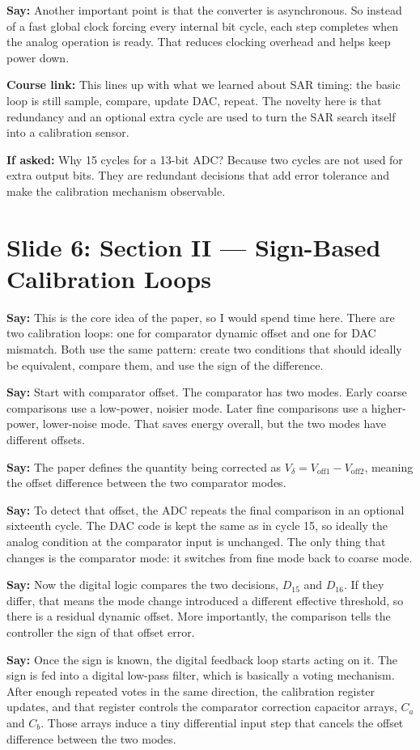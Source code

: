 \documentclass[11pt]{article}
\newcommand{\speak}[1]{\textbf{Say:} #1}
\newcommand{\ifasked}[1]{\textbf{If asked:} #1}
\newcommand{\course}[1]{\textbf{Course link:} #1}
\begin{document}
\speak{Another important point is that the converter is asynchronous. So instead of a fast global clock forcing every internal bit cycle, each step completes when the analog operation is ready. That reduces clocking overhead and helps keep power down.}

\course{This lines up with what we learned about SAR timing: the basic loop is still sample, compare, update DAC, repeat. The novelty here is that redundancy and an optional extra cycle are used to turn the SAR search itself into a calibration sensor.}

\ifasked{Why 15 cycles for a 13-bit ADC? Because two cycles are not used for extra output bits. They are redundant decisions that add error tolerance and make the calibration mechanism observable.}

\section*{Slide 6: Section II --- Sign-Based Calibration Loops}
\speak{This is the core idea of the paper, so I would spend time here. There are two calibration loops: one for comparator dynamic offset and one for DAC mismatch. Both use the same pattern: create two conditions that should ideally be equivalent, compare them, and use the sign of the difference.}

\speak{Start with comparator offset. The comparator has two modes. Early coarse comparisons use a low-power, noisier mode. Later fine comparisons use a higher-power, lower-noise mode. That saves energy overall, but the two modes have different offsets.}

\speak{The paper defines the quantity being corrected as $V_{\delta}=V_{\text{off1}}-V_{\text{off2}}$, meaning the offset difference between the two comparator modes.}

\speak{To detect that offset, the ADC repeats the final comparison in an optional sixteenth cycle. The DAC code is kept the same as in cycle 15, so ideally the analog condition at the comparator input is unchanged. The only thing that changes is the comparator mode: it switches from fine mode back to coarse mode.}

\speak{Now the digital logic compares the two decisions, $D_{15}$ and $D_{16}$. If they differ, that means the mode change introduced a different effective threshold, so there is a residual dynamic offset. More importantly, the comparison tells the controller the sign of that offset error.}

\speak{Once the sign is known, the digital feedback loop starts acting on it. The sign is fed into a digital low-pass filter, which is basically a voting mechanism. After enough repeated votes in the same direction, the calibration register updates, and that register controls the comparator correction capacitor arrays, $C_a$ and $C_b$. Those arrays induce a tiny differential input step that cancels the offset difference between the two modes.}
\end{document}
